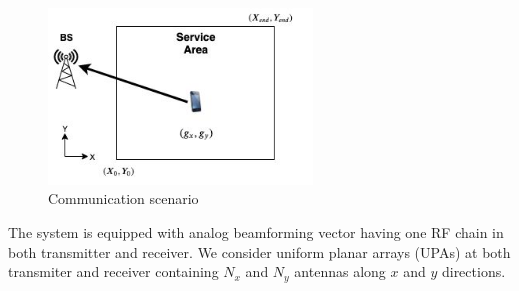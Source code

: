 \documentclass[12pt, draftcls, onecolumn]{IEEEtran}
\theoremstyle{plain}
\theoremstyle{definition}
\theoremstyle{remark}
\newcommand{\nt}[1]{\textcolor{red}{\textbf{[#1]}}}
\newcommand{\round}[1]{\ensuremath{\left\lfloor#1\right\rceil}}
\begin{document}





\begin{figure}
    \centering
    \includegraphics[width=7cm]{system_model.jpg}
    \caption{Communication scenario}
    \label{fig:wireless_comm_scenario}
    \vspace{-5mm}
\end{figure}
The system is equipped with analog beamforming vector having one RF chain in both transmitter and receiver.
We consider uniform planar arrays (UPAs) at both transmiter and receiver containing $N_x$ and $N_y$ antennas along $x$ and $y$ directions.
\end{document}
